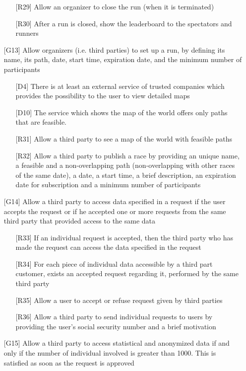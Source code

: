 \begin{itemize}
\begin{itemize}
	\item[{[R29]}] Allow an organizer to close the run (when it is terminated)
	\item[{[R30]}] After a run is closed, show the leaderboard to the spectators and runners
	\end{itemize}
\item[{[G13]}] Allow organizers (i.e. third parties) to set up a run, by defining its name, its path, date, start time, expiration date, and the minimum number of participants
	\begin{itemize}
	\item[{[D4]}] There is at least an external service of trusted companies which provides the possibility to the user to view detailed maps
	\item[{[D10]}] The service which shows the map of the world offers only paths that are feasible.
	\item[{[R31]}] Allow a third party to see a map of the world with feasible paths
	\item[{[R32]}] Allow a third party to publish a race by providing an unique name, a feasible and a non-overlapping path (non-overlapping with other races of the same date), a date, a start time, a brief description, an expiration date for subscription and a minimum number of participants
	\end{itemize}
\item[{[G14]}] Allow a third party to access data specified in a request if the user accepts the request or if he accepted one or more requests from the same third party that provided access to the same data 
	\begin{itemize}
	\item[{[R33]}] If an individual request is accepted, then the third party who has made the request can access the data specified in the request
	\item[{[R34]}] For each piece of individual data accessible by a third part customer, exists an accepted request regarding it, performed by the same third party 
	\item[{[R35]}] Allow a user to accept or refuse request given by third parties
	\item[{[R36]}] Allow a third party to send individual requests to users by providing the user's social security number and a brief motivation
	\end{itemize}
\item[{[G15]}] Allow a third party to access statistical and anonymized data if and only if the number of individual involved is greater than 1000. This is satisfied as soon as the request is approved  

\end{itemize}
